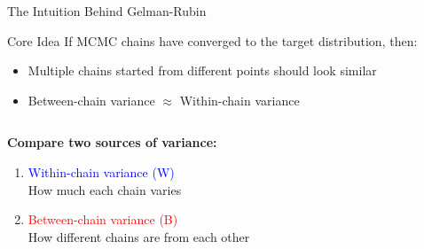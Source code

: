 \documentclass[aspectratio=169]{beamer}
\begin{document}
\begin{frame}{The Intuition Behind Gelman-Rubin}
    \begin{block}{Core Idea}
        If MCMC chains have converged to the target distribution, then:
        \begin{itemize}
            \item Multiple chains started from different points should look similar
            \item Between-chain variance $\approx$ Within-chain variance
        \end{itemize}
    \end{block}
    
    \vspace{0.5cm}
    \begin{columns}
        \begin{column}{0.5\textwidth}
            \textbf{Compare two sources of variance:}
            \begin{enumerate}
                \item \textcolor{blue}{Within-chain variance (W)}\\
                How much each chain varies
                \item \textcolor{red}{Between-chain variance (B)}\\
                How different chains are from each other
            \end{enumerate}
        \end{column}
        \begin{column}{0.5\textwidth}
            \begin{center}
            \end{center}
        \end{column}
    \end{columns}
\end{frame}
\end{document}
